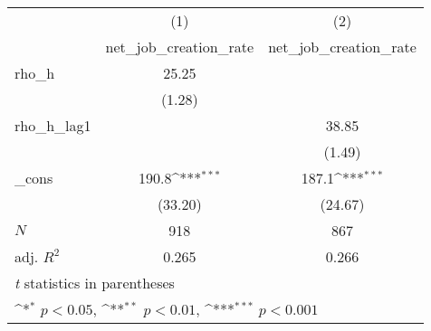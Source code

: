{
\def\sym#1{\ifmmode^{#1}\else\(^{#1}\)\fi}
\begin{tabular}{l*{2}{c}}
\toprule
            &\multicolumn{1}{c}{(1)}&\multicolumn{1}{c}{(2)}\\
            &\multicolumn{1}{c}{net\_job\_creation\_rate}&\multicolumn{1}{c}{net\_job\_creation\_rate}\\
\midrule
rho\_h       &       25.25         &                     \\
            &      (1.28)         &                     \\
\addlinespace
rho\_h\_lag1  &                     &       38.85         \\
            &                     &      (1.49)         \\
\addlinespace
\_cons      &       190.8\sym{***}&       187.1\sym{***}\\
            &     (33.20)         &     (24.67)         \\
\midrule
\(N\)       &         918         &         867         \\
adj. \(R^{2}\)&       0.265         &       0.266         \\
\bottomrule
\multicolumn{3}{l}{\footnotesize \textit{t} statistics in parentheses}\\
\multicolumn{3}{l}{\footnotesize \sym{*} \(p<0.05\), \sym{**} \(p<0.01\), \sym{***} \(p<0.001\)}\\
\end{tabular}
}
